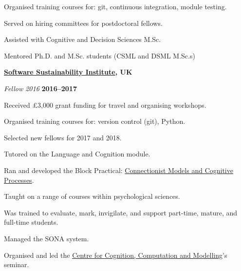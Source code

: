       \item  Organised training courses for: git, continuous integration, module testing.
    \item  Served on hiring committees for postdoctoral fellows.
    \item  Assisted with Cognitive and Decision Sciences M.Sc.
    \item  Mentored Ph.D. and M.Sc. students (CSML and DSML M.Sc.s)
    
      \textbf{\href{http://www.software.ac.uk/}{Software Sustainability Institute}, UK}
  \begin{outerlist}
  \item[\textit{Fellow 2016}] \hfill \textbf{2016--2017}
  
  \begin{innerlist}
    \item    Received £3,000 grant funding for travel and organising workshops.
    \item  Organised training courses for: version control (git), Python.
    \item  Selected new fellows for 2017 and 2018.
  \end{innerlist}
  \end{outerlist}
  \vspace{15pt}
 
     \item Tutored on the Language and Cognition module.
    \item Ran and developed the Block Practical: \href{http://oliviaguest.com/connectionism}{Connectionist Models and Cognitive Processes}.

  \begin{innerlist}
    \item Taught on a range of courses within psychological sciences.
    \item Was trained to evaluate, mark, invigilate, and support part-time, mature, and full-time students.
    \item Managed the SONA system.
    \item Organised and led the \href{http://cccm.bbk.ac.uk/}{Centre for Cognition, Computation and Modelling}'s  seminar. 
  \end{innerlist} 
  
